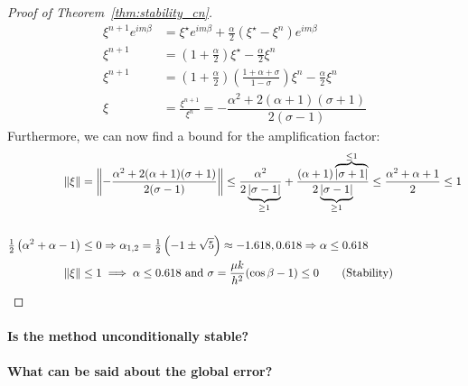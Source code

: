 \begin{proof}[Proof of Theorem~\ref{thm:stability_cn}]
\begin{align*}
    \xi^{n+1} e^{i m \beta} & = \xi^\star e^{i m \beta} + \tfrac{\alpha}{2}(\xi^\star - \xi^n)e^{i m \beta}                                           \\
    \xi^{n+1}               & = (1 + \tfrac{\alpha}{2}) \xi^\star - \tfrac{\alpha}{2} \xi^n                                                           \\
    \xi^{n+1}               & = \left(1 + \tfrac{\alpha}{2}\right)\left(\tfrac{1 + \alpha + \sigma}{1 - \sigma}\right)\xi^n - \tfrac{\alpha}{2} \xi^n \\
    \xi                     & = \tfrac{\xi^{n+1}}{\xi^n} = -\dfrac{\alpha^2 + 2(\alpha + 1) (\sigma + 1)}{2 (\sigma - 1)} \tag{Source: Trust me bro}
  \end{align*}
  Furthermore, we can now find a bound for the amplification factor:
  \begin{align*}
    \norm*{\xi}                                    & = \norm*{-\dfrac{\alpha^2 + 2(\alpha + 1)(\sigma + 1)}{2(\sigma - 1)}} \leq \dfrac{\alpha^2}{2\underbrace{\abs*{\sigma - 1}}_{\geq 1}} + \dfrac{(\alpha + 1)\overbrace{\abs*{\sigma + 1}}^{\leq 1}}{2\underbrace{\abs{\sigma - 1}}_{\geq 1}} \leq \dfrac{\alpha^2+ \alpha + 1}{2} \leq 1 \\                                                                                                                                                                                                                     \\
    \tfrac{1}{2}\left(\alpha^2 + \alpha - 1\right) & \leq 0 \Rightarrow \alpha_{1,2} = \tfrac{1}{2}\left(-1 \pm \sqrt{5}\right) \approx -1.618, 0.618 \Rightarrow \alpha \leq 0.618                                                                                                                                                           \\
    \norm*{\xi}                                    & \leq 1 \implies \alpha \leq 0.618 \text{ and } \sigma = \frac{\mu k}{h^2}(\cos\beta - 1) \leq 0 \tag{Stability}
  \end{align*}
\end{proof}

\paragraph{\color{red} Is the method unconditionally stable?}

\paragraph{\color{red} What can be said about the global error?}

